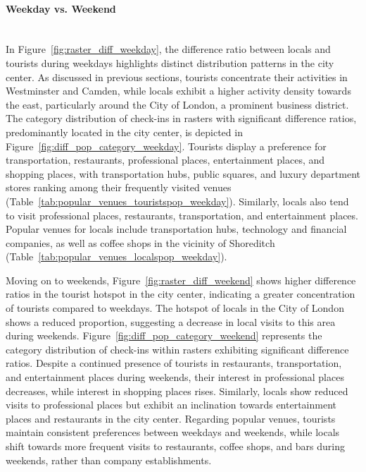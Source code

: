 \documentclass{article}
\newcommand{\subsubsubsection}[1]{\paragraph{#1}\mbox{}\\}
\begin{document}
\subsubsubsection{Weekday vs. Weekend}
In Figure~\ref{fig:raster_diff_weekday}, the difference ratio between locals and tourists during weekdays highlights distinct distribution patterns in the city center. As discussed in previous sections, tourists concentrate their activities in Westminster and Camden, while locals exhibit a higher activity density towards the east, particularly around the City of London, a prominent business district. The category distribution of check-ins in rasters with significant difference ratios, predominantly located in the city center, is depicted in Figure~\ref{fig:diff_pop_category_weekday}. Tourists display a preference for transportation, restaurants, professional places, entertainment places, and shopping places, with transportation hubs, public squares, and luxury department stores ranking among their frequently visited venues (Table~\ref{tab:popular_venues_touristspop_weekday}). Similarly, locals also tend to visit professional places, restaurants, transportation, and entertainment places. Popular venues for locals include transportation hubs, technology and financial companies, as well as coffee shops in the vicinity of Shoreditch (Table~\ref{tab:popular_venues_localspop_weekday}).


Moving on to weekends, Figure~\ref{fig:raster_diff_weekend} shows higher difference ratios in the tourist hotspot in the city center, indicating a greater concentration of tourists compared to weekdays. The hotspot of locals in the City of London shows a reduced proportion, suggesting a decrease in local visits to this area during weekends. Figure~\ref{fig:diff_pop_category_weekend} represents the category distribution of check-ins within rasters exhibiting significant difference ratios. Despite a continued presence of tourists in restaurants, transportation, and entertainment places during weekends, their interest in professional places decreases, while interest in shopping places rises. Similarly, locals show reduced visits to professional places but exhibit an inclination towards entertainment places and restaurants in the city center. Regarding popular venues, tourists maintain consistent preferences between weekdays and weekends, while locals shift towards more frequent visits to restaurants, coffee shops, and bars during weekends, rather than company establishments.
\end{document}
